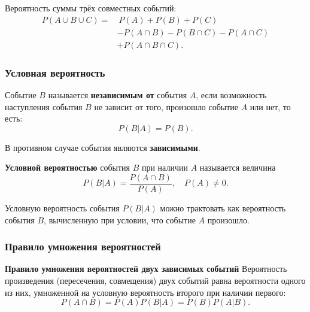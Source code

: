 \documentclass[a4paper]{article}
\newcommand{\key}[1]{{\color{Medium}\bfseries #1}}
\begin{document}
                Вероятность суммы трёх совместных событий:
                \begin{equation*}
                    \begin{aligned}
                        P(A \cup B \cup C) = &~ P(A) + P(B) + P(C) \\[1.0ex]
                        & - P(A \cap B) - P(B \cap C) - P(A \cap C) \\[1.0ex]
                        & + P(A \cap B \cap C) .
                    \end{aligned}
                \end{equation*}

            \subsubsection{Условная вероятность}

                Событие $B$ называется \key{независимым от} события $A$, если возможность наступления события $B$ не зависит от того, произошло событие $A$ или нет, то есть:
                \begin{equation*}
                    P(B | A) = P(B) .
                \end{equation*}

                В противном случае события являются \key{зависимыми}.

                \key{Условной вероятностью} события $B$ при наличии $A$ называется величина
                \begin{equation*}
                    P(B | A) = \frac{P(A \cap B)}{P(A)} , \quad P(A) \neq 0 .
                \end{equation*}

                Условную вероятность события $P(B | A)$ можно трактовать как вероятность события $B$, вычисленную при условии, что событие $A$ произошло.

            \subsubsection{Правило умножения вероятностей}

                \key{Правило умножения вероятностей двух зависимых событий} \newline
                Вероятность произведения (пересечения, совмещения) двух событий равна вероятности одного из них, умноженной на условную вероятность второго при наличии первого:
                \begin{equation*}
                    P(A \cap B) = P(A) P(B | A) = P(B) P(A | B) .
                \end{equation*}
\end{document}
